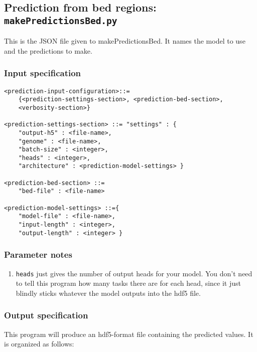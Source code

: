 \documentclass{article}
\begin{document}
\newpage

\subsection{Prediction from bed regions: \texttt{makePredictionsBed.py}}

This is the JSON file given to makePredictionsBed. It names the model to use and the predictions to make. 

\subsubsection{Input specification}

\begin{lstlisting}
<prediction-input-configuration>::=
    {<prediction-settings-section>, <prediction-bed-section>,
    <verbosity-section>}

<prediction-settings-section> ::= "settings" : {
    "output-h5" : <file-name>,
    "genome" : <file-name>,
    "batch-size" : <integer>,
    "heads" : <integer>,
    "architecture" : <prediction-model-settings> }

<prediction-bed-section> ::=
    "bed-file" : <file-name>

<prediction-model-settings> ::={
    "model-file" : <file-name>,
    "input-length" : <integer>,
    "output-length" : <integer> }
\end{lstlisting}

\subsubsection{Parameter notes}

\begin{enumerate}
    \item \texttt{heads} just gives the number of output heads for your model. You don't need to tell this program how many tasks there are for each head, since it just blindly sticks whatever the model outputs into the hdf5 file. 
\end{enumerate}

\subsubsection{Output specification}

This program will produce an hdf5-format file containing the predicted values. It is organized as follows:
\end{document}
